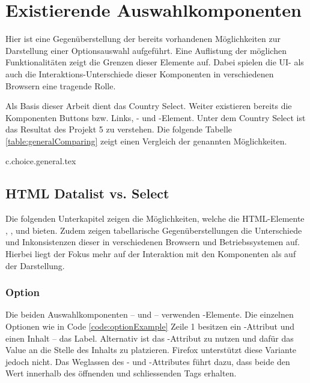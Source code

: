 \chapter{Existierende Auswahlkomponenten}
\label{chap:existingComponents}

Hier ist eine Gegenüberstellung der bereits vorhandenen Möglichkeiten zur Darstellung einer Optionsauswahl aufgeführt.
Eine Auflistung der möglichen Funktionalitäten zeigt die Grenzen dieser Elemente auf.
Dabei spielen die UI- als auch die Interaktions-Unterschiede dieser Komponenten in verschiedenen Browsern eine tragende Rolle.

Als Basis dieser Arbeit dient das Country Select.
Weiter existieren bereits die Komponenten Buttons bzw. Links, - und -Element.
Unter dem Country Select ist das Resultat des Projekt 5 zu verstehen.
Die folgende Tabelle \ref{table:generalComparing} zeigt einen Vergleich der genannten Möglichkeiten.

{c.choice.general.tex}


\section{HTML Datalist vs. Select}
\label{sec:datalistSelect}

Die folgenden Unterkapitel zeigen die Möglichkeiten, welche die HTML-Elemente , ,  und  bieten.
Zudem zeigen tabellarische Gegenüberstellungen die Unterschiede und Inkonsistenzen dieser in verschiedenen Browsern und Betriebssystemen auf.
Hierbei liegt der Fokus mehr auf der Interaktion mit den Komponenten als auf der Darstellung.


\subsection{Option}
\label{sec:option}

Die beiden Auswahlkomponenten –  und  – verwenden -Elemente. 
Die einzelnen Optionen wie in Code \ref{code:optionExample} Zeile 1 besitzen ein -Attribut und einen Inhalt – das Label.
Alternativ ist das -Attribut zu nutzen und dafür das Value an die Stelle des Inhalts zu platzieren.
Firefox unterstützt diese Variante jedoch nicht.
Das Weglassen des - und -Attributes führt dazu, dass beide den Wert innerhalb des öffnenden und schliessenden Tags erhalten.

